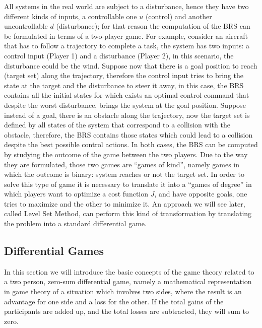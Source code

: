 All systems in the real world are subject to a disturbance, hence they have two different kinds of inputs, a controllable one $u$ (control) and another uncontrollable $d$ (disturbance); for that reason the computation of the BRS can be formulated in terms of a two-player game. For example, consider an aircraft that has to follow a trajectory to complete a task, the system has two inputs: a control input (Player 1) and a disturbance (Player 2), in this scenario, the disturbance could be the wind. Suppose now that there is a goal position to reach (target set) along the trajectory, therefore the control input tries to bring the state at the target and the disturbance to steer it away, in this case, the BRS contains all the initial states for which exists an optimal control command that despite the worst disturbance, brings the system at the goal position. Suppose instead of a goal, there is an obstacle along the trajectory, now the target set is defined by all states of the system that correspond to a collision with the obstacle, therefore, the BRS contains those states which could lead to a collision despite the best possible control actions. In both cases, the BRS can be computed by studying the outcome of the game between the two players. Due to the way they are formulated, those two games are “games of kind”, namely games in which the outcome is binary: system reaches or not the target set. In order to solve this type of game it is necessary to translate it into a “games of degree” in which players want to optimize a cost function $J$, and have opposite goals, one tries to maximize and the other to minimize it. An approach we will see later, called Level Set Method, can perform this kind of transformation by translating the problem into a standard differential game.

\subsection{Differential Games}
In this section we will introduce the basic concepts of the game theory related to a two person, zero-sum differential game, namely a mathematical representation in game theory of a situation which involves two sides, where the result is an advantage for one side and a loss for the other. If the total gains of the participants are added up, and the total losses are subtracted, they will sum to zero. 
\newline


